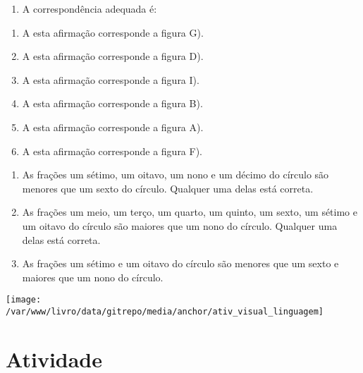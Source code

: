 \documentclass[a4paper,12pt,twoside]{book}
\begin{document}
\begin{resposta*}[breakable]{}{}  
\begin{enumerate} [\quad a)] %
    \item       A correspondência adequada é:
\end{enumerate} %
  
\begin{enumerate} [\quad a)] %
    \item       A esta afirmação corresponde a figura G).
    \item       A esta afirmação corresponde a figura D).
    \item       A esta afirmação corresponde a figura I).
    \item       A esta afirmação corresponde a figura B).
    \item       A esta afirmação corresponde a figura A).
    \item       A esta afirmação corresponde a figura F).
\end{enumerate} %
  
\begin{enumerate} [\quad a)] %
    \item       As frações um sétimo, um oitavo, um nono e um décimo do círculo são menores que um sexto do círculo. Qualquer uma delas está correta.
    \item       As frações um meio, um terço, um quarto, um quinto, um sexto, um sétimo e um oitavo do círculo são maiores que um nono do círculo. Qualquer uma delas está correta.
    \item       As frações um sétimo e um oitavo do círculo são menores que um sexto e maiores que um nono do círculo.
\end{enumerate} %
  
\end{resposta*}



\texttt{[image: /var/www/livro/data/gitrepo/media/anchor/ativ\_visual\_linguagem]}
\section{Atividade}
\end{document}
